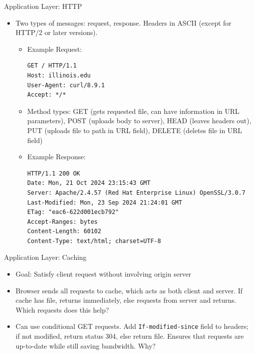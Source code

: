 \documentclass{beamer}
\begin{document}
\begin{frame}[fragile, t]{Application Layer: HTTP}
    \begin{itemize}
        \item Two types of messages: \alert{request}, \alert{response}. Headers in ASCII (except for HTTP/2 or later versions).
        \begin{itemize}
            \item Example Request: {\small \begin{verbatim}
GET / HTTP/1.1
Host: illinois.edu
User-Agent: curl/8.9.1
Accept: */*
            \end{verbatim}}
            \item \pause Method types: GET (gets requested file, can have information in URL parameters), POST (uploads body to server), HEAD (leaves headers out), PUT (uploads file to path in URL field), DELETE (deletes file in URL field)
            \vspace{.5cm}
            \item \pause Example Response: {\small \begin{verbatim}
HTTP/1.1 200 OK
Date: Mon, 21 Oct 2024 23:15:43 GMT
Server: Apache/2.4.57 (Red Hat Enterprise Linux) OpenSSL/3.0.7
Last-Modified: Mon, 23 Sep 2024 21:24:01 GMT
ETag: "eac6-622d001ecb792"
Accept-Ranges: bytes
Content-Length: 60102
Content-Type: text/html; charset=UTF-8
            \end{verbatim}}
        \end{itemize}
    \end{itemize}
\end{frame}

\begin{frame}[t]{Application Layer: Caching}
    \begin{itemize}
        \item \alert{Goal}: Satisfy client request without involving origin server
        \item \pause Browser sends all requests to cache, which acts as both client and server. If cache has file, returns immediately, else requests from server and returns. \alert{Which requests does this help?}
        \item \pause Can use \alert{conditional GET requests}. Add \texttt{If-modified-since} field to headers; if not modified, return status 304, else return file. Ensures that requests are up-to-date while still saving bandwidth. \alert{Why?}
    \end{itemize}
\end{frame}
\end{document}
